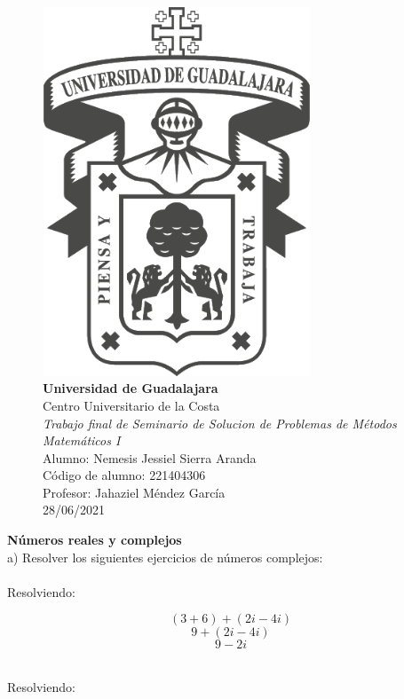 \documentclass[11pt]{report}
\begin{document}
\null
\vfill
\begin{figure}[h]
\centering
\includegraphics[width=8cm, height=11cm]{logo}\\[10mm]
{\LARGE\textbf{Universidad de Guadalajara}}\\[2mm]
Centro Universitario de la Costa\\[2mm]
\textit{Trabajo final de Seminario de Solucion de Problemas de Métodos Matemáticos I} \\[2mm]
Alumno: Nemesis Jessiel Sierra Aranda\\[2mm]
Código de alumno: 221404306\\[2mm]
Profesor: Jahaziel Méndez García\\[2mm]
28/06/2021\\
\end{figure}
\vfill
\pagebreak \textbf {Números reales y complejos}\\[2mm]
a) Resolver los siguientes ejercicios de números complejos:\\[2mm]
\\[2mm]
\indent Resolviendo:

$$(3+6)+(2i-4i)$$
$$9+(2i-4i)$$
$$9-2i$$

\\[2mm]
\indent Resolviendo:
\end{document}
